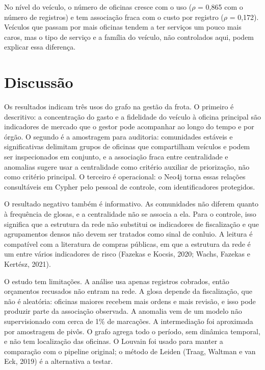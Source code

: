 \documentclass[12pt,a4paper]{article}
\begin{document}
No nível do veículo, o número de oficinas cresce com o uso ($\rho$ = 0,865 com o número de registros) e tem associação fraca com o custo por registro ($\rho$ = 0,172). Veículos que passam por mais oficinas tendem a ter serviços um pouco mais caros, mas o tipo de serviço e a família do veículo, não controlados aqui, podem explicar essa diferença.

\section{Discussão}
Os resultados indicam três usos do grafo na gestão da frota. O primeiro é descritivo: a concentração do gasto e a fidelidade do veículo à oficina principal são indicadores de mercado que o gestor pode acompanhar ao longo do tempo e por órgão. O segundo é a amostragem para auditoria: comunidades estáveis e significativas delimitam grupos de oficinas que compartilham veículos e podem ser inspecionados em conjunto, e a associação fraca entre centralidade e anomalias sugere usar a centralidade como critério auxiliar de priorização, não como critério principal. O terceiro é operacional: o Neo4j torna essas relações consultáveis em Cypher pelo pessoal de controle, com identificadores protegidos.

O resultado negativo também é informativo. As comunidades não diferem quanto à frequência de glosas, e a centralidade não se associa a ela. Para o controle, isso significa que a estrutura da rede não substitui os indicadores de fiscalização e que agrupamentos densos não devem ser tratados como sinal de conluio. A leitura é compatível com a literatura de compras públicas, em que a estrutura da rede é um entre vários indicadores de risco (Fazekas e Kocsis, 2020; Wachs, Fazekas e Kertész, 2021).

O estudo tem limitações. A análise usa apenas registros cobrados, então orçamentos recusados não entram na rede. A glosa depende da fiscalização, que não é aleatória: oficinas maiores recebem mais ordens e mais revisão, e isso pode produzir parte da associação observada. A anomalia vem de um modelo não supervisionado com cerca de 1\% de marcações. A intermediação foi aproximada por amostragem de pivôs. O grafo agrega todo o período, sem dinâmica temporal, e não tem localização das oficinas. O Louvain foi usado para manter a comparação com o pipeline original; o método de Leiden (Traag, Waltman e van Eck, 2019) é a alternativa a testar.
\end{document}
